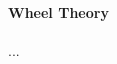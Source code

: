 \paragraph{Wheel Theory}...





\begin{comment}

Explain the edge case where additive neutral elements have a multiplicative inverse. I think Michael Penn has a video about that called somethign like "when division by zero isn't ..." IIRC	

 We have used the symbol $1$ to denote the multiplicative neutral element. 

The notation $a^{-1}$ is now used for the multiplicative inverse of $a$, so we need a new notation for the additive inverse. We will use $-a$ to denote the additive inverse of $a$. In the axiom about multiplicative inverses, we have excluded the $0$ element. The additive neutral element (i.e. zero) is the only element for which we do not require to have a multiplicative inverse. It can in fact be shown that - some uninteresting trivial edge cases aside - the additive neutral element cannot possibly have a multiplicative inverse in any ring. 

https://en.wikipedia.org/wiki/Finite_field
https://en.wikipedia.org/wiki/Cyclotomic_field

Warum kann man nicht durch null teilen? Oder: Was sind Zahlen eigentlich?
https://www.youtube.com/watch?v=v05rI0lGk6A

https://en.wikipedia.org/wiki/Quadratic_field


https://www.youtube.com/watch?v=
4BfCmZgOKP8  Was sind Galoiskörper? [Weitz]


https://en.wikipedia.org/wiki/Splitting_field

-In groups, we can always solve equations like a*x = b
-In fields, we can always solve equations like a*x + b = c (in rings only sometimes)
-In algebraically closed fields, we can always solve polynomial equations - but only in principle, 
 i.e. in the sense that solutions exist and we may find them numerically. Up to degree 4, there are
 formulas in terms of the coeffs. ...do these formulas also apply to finite fields?
-Field extensions can be writte like R/Q or just with the subset symbol
-Degree of field extension: if L is a field extesnion over K. We may interpret L as a vector space 
 over K. For example. C is a field extension over R has degree 2. We write this as 
 [C:R] = dim_R(C) = 2, dim_F(F) = 1 always, [Q(sqrt(2)) : Q] dim_Q(Q(sqrt(2))) = 2,
 [Q(cbrt(2)) : Q] = 3  bcs  Q(cbrt(2))  = { a + b sqrt(2) + c cbrt(2^2) :  a,b,c in Q }
 [R : Q] = inf, R = { a + b r_1 + c * r_2 + d * r_3 + ...   where r_in in R }
 [F(a) : F] = deg(m_a(x)) where m_a(x) is the minimal polynomial for a (a is an algebraic number)
 For a chain of field extensions F \subset G \subset H we have:
 [H :  F] = [H : G] * [G : F]



\end{comment}
